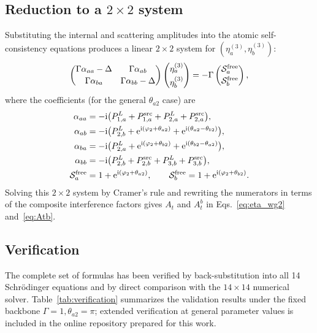 \documentclass[aps,pra,reprint,superscriptaddress,nofootinbib,longbibliography,floatfix]{revtex4-2}
\newcommand{\ii}{\mathrm{i}}
\newcommand{\ee}{\mathrm{e}}
\newcommand{\ph}{\varphi}
\newcommand{\thatwo}{\theta_{a2}}
\newcommand{\thbtwo}{\theta_{b2}}
\begin{document}
\subsection{\texorpdfstring{Reduction to a $2\times2$ system}{Reduction to a 2x2 system}}

Substituting the internal and scattering amplitudes into the atomic self-consistency equations produces a linear $2\times2$ system for $(\eta_a^{(3)},\eta_b^{(3)})$:
\begin{equation}
\begin{pmatrix}
\Gamma\alpha_{aa}-\Delta & \Gamma\alpha_{ab} \\[2pt]
\Gamma\alpha_{ba} & \Gamma\alpha_{bb}-\Delta
\end{pmatrix}
\begin{pmatrix}
\eta_a^{(3)} \\[2pt] \eta_b^{(3)}
\end{pmatrix}
= -\Gamma
\begin{pmatrix}
\mathcal{S}_a^{\rm free} \\[2pt] \mathcal{S}_b^{\rm free}
\end{pmatrix},
\end{equation}
where the coefficients (for the general $\theta_{a2}$ case) are
\begin{align}
\alpha_{aa} &= -\ii\bigl(P_{1,a}^{L}+P_{1,a}^{\rm src}+P_{2,a}^{L}+P_{2,a}^{\rm src}\bigr),\\
\alpha_{ab} &= -\ii\bigl(P_{2,b}^{L}+\ee^{\ii(\ph_2+\thatwo)}+\ee^{\ii(\thatwo-\thbtwo)}\bigr),\\
\alpha_{ba} &= -\ii\bigl(P_{2,a}^{L}+\ee^{\ii(\ph_2+\thbtwo)}+\ee^{\ii(\thbtwo-\thatwo)}\bigr),\\
\alpha_{bb} &= -\ii\bigl(P_{2,b}^{L}+P_{2,b}^{\rm src}+P_{3,b}^{L}+P_{3,b}^{\rm src}\bigr),\\
\mathcal{S}_a^{\rm free} &= 1+\ee^{\ii(\ph_2+\thatwo)},
\qquad
\mathcal{S}_b^{\rm free} = 1+\ee^{\ii(\ph_2+\thbtwo)}.
\end{align}
Solving this $2\times2$ system by Cramer's rule and rewriting the numerators in terms of the composite interference factors gives $A_t$ and $A_t^b$ in Eqs.~\eqref{eq:eta_wg2} and~\eqref{eq:Atb}.

\subsection{Verification}

The complete set of formulas has been verified by back-substitution into all 14 Schr\"{o}dinger equations and by direct comparison with the $14\times14$ numerical solver.
Table~\ref{tab:verification} summarizes the validation results under the fixed backbone $\Gamma=1,\theta_{a2}=\pi$; extended verification at general parameter values is included in the online repository prepared for this work.
\end{document}

